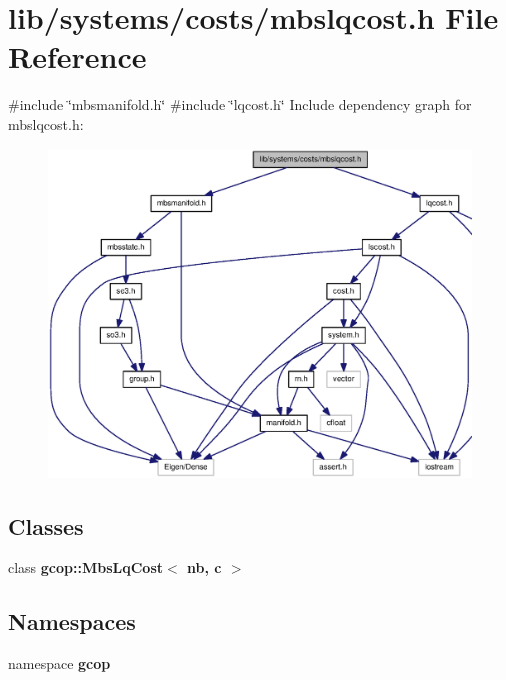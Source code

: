 \section{lib/systems/costs/mbslqcost.h \-File \-Reference}
\label{mbslqcost_8h}
{\ttfamily \#include \char`\"{}mbsmanifold.\-h\char`\"{}}\*
{\ttfamily \#include \char`\"{}lqcost.\-h\char`\"{}}\*
\-Include dependency graph for mbslqcost.\-h\-:\nopagebreak
\begin{figure}[H]
\begin{center}
\leavevmode
\includegraphics[width=350pt]{mbslqcost_8h__incl}
\end{center}
\end{figure}
\subsection*{\-Classes}
\begin{DoxyCompactItemize}
\item 
class {\bf gcop\-::\-Mbs\-Lq\-Cost$<$ nb, c $>$}
\end{DoxyCompactItemize}
\subsection*{\-Namespaces}
\begin{DoxyCompactItemize}
\item 
namespace {\bf gcop}
\end{DoxyCompactItemize}
